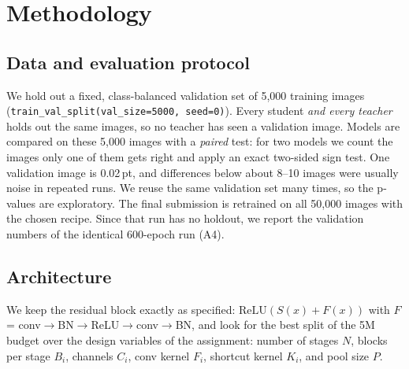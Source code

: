 \documentclass[10pt]{article}
\newcommand{\pt}{\,pt}
\begin{document}
\section{Methodology}

\subsection{Data and evaluation protocol}
We hold out a fixed, class-balanced validation set of 5,000 training images
(\texttt{train\_val\_split(val\_size=5000, seed=0)}). Every student \emph{and every teacher} holds out
the same images, so no teacher has seen a validation image. Models are compared on these 5,000 images with a
\emph{paired} test: for two models we count the images only one of them gets right and apply an exact
two-sided sign test. One validation image is 0.02\pt, and differences below about 8--10 images
were usually noise in repeated runs. We reuse the same validation set many times, so the p-values are
exploratory. The final submission is retrained on all 50,000 images with the chosen recipe.
Since that run has no holdout, we report the validation numbers of the identical 600-epoch run (A4).

\subsection{Architecture}
We keep the residual block exactly as specified: $\mathrm{ReLU}(S(x)+F(x))$ with
$F$ = conv$\to$BN$\to$ReLU$\to$conv$\to$BN, and look for the best split of the 5M budget over the design
variables of the assignment:
number of stages $N$, blocks per stage $B_i$, channels $C_i$, conv kernel $F_i$, shortcut kernel $K_i$, and pool size $P$.
\end{document}
